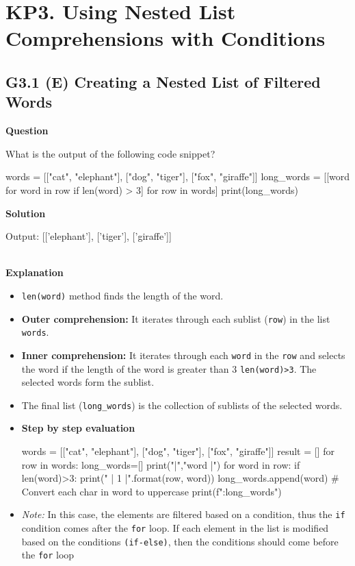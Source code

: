 \documentclass[10pt]{extarticle}
\begin{document}
\section*{KP3. Using Nested List Comprehensions with Conditions}
\subsection*{G3.1 (E) Creating a Nested List of Filtered Words}

\textbf{Question}

What is the output of the following code snippet?

    \begin{python}
    words = [["cat", "elephant"], ["dog", "tiger"], ["fox", "giraffe"]]
    long_words = [[word for word in row if len(word) > 3] for row in words]
    print(long_words)
    \end{python}

\noindent\textbf{Solution}

\begin{python}
Output: [['elephant'], ['tiger'], ['giraffe']]
\end{python}  \\

\noindent\textbf{Explanation}

\begin{itemize}
    \item \colorbox{gray!20}{\texttt{len(word)}} method finds the length of the word.
    \item \textbf{Outer comprehension:} It iterates through each sublist (\texttt{row}) in the list \texttt{words}.
    \item \textbf{Inner comprehension:} It iterates through each \texttt{word} in the \texttt{row} and selects the word if the length of the word is greater than $3$ \colorbox{gray!20}{\texttt{len(word)>3}}.
    The selected words form the sublist.
    \item The final list (\texttt{long\_words}) is the collection of sublists of the selected words.
    \item \textbf{Step by step evaluation}
    \begin{tcolorbox}[colback=gray!20, colframe=gray!50, sharp corners=southwest]
    \begin{pycode}
words = [["cat", "elephant"], ["dog", "tiger"], ["fox", "giraffe"]]
result = []
for row in words:
  long_words=[]
  print("\nrow |","word |")
  for word in row:
    if len(word)>3:
          print(" | {1} |".format(row, word))
          long_words.append(word) 
           # Convert each char in word to uppercase
  print(f"\nSublist:{long_words}")  

    \end{pycode}
    \end{tcolorbox}
    \item \textit{Note:} In this case, the elements are filtered based on a condition, thus the \texttt{if} condition comes after the \texttt{for} loop.
    If each element in the list is modified based on the conditions \texttt{(if-else)}, then the conditions should come before the \texttt{for} loop 
\end{itemize}
\end{document}
